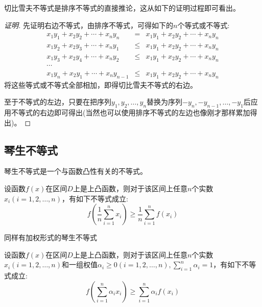 切比雪夫不等式是排序不等式的直接推论，这从如下的证明过程即可看出。

\begin{proof}[证明]
  先证明右边不等式，由排序不等式，可得如下的$n$个等式或不等式:
  \begin{eqnarray*}
    x_1y_1+x_2y_2+\cdots+x_ny_n &=& x_1y_1+x_2y_2+\cdots+x_ny_n \\
    x_1y_2+x_2y_3+\cdots+x_ny_1 & \leqslant & x_1y_1+x_2y_2+\cdots+x_ny_n \\
    x_1y_3+x_2y_4+\cdots+x_ny_2 & \leqslant & x_1y_1+x_2y_2+\cdots+x_ny_n \\
    \cdots & & \\
    x_1y_n+x_2y_1+\cdots+x_ny_{n-1} & \leqslant & x_1y_1+x_2y_2+\cdots+x_ny_n 
  \end{eqnarray*}
  将这些等式或不等式全部相加，即得切比雪夫不等式的右边。

  至于不等式的左边，只要在把序列$y_1,y_2,\ldots,y_n$替换为序列$-y_n,-y_{n-1},\ldots,-y_1$后应用不等式的右边即可得出(当然也可以使用排序不等式的左边也像刚才那样累加得出)。
\end{proof}

\subsection{琴生不等式}
\label{sec:jenson-inequality}

琴生不等式是一个与函数凸性有关的不等式。
\begin{theorem}[琴生不等式]
  设函数$f(x)$在区间$D$上是上凸函数，则对于该区间上任意$n$个实数$x_i(i=1,2,\ldots,n)$，有如下不等式成立:
  \begin{equation}
    \label{eq:jenson-inequality-some-import-inequality}
    f \left( \frac{1}{n} \sum_{i=1}^nx_i \right) \geqslant
    \frac{1}{n} \sum_{i=1}^n f(x_i)
  \end{equation}
\end{theorem}

同样有加权形式的琴生不等式
\begin{theorem}[加权形式的琴生不等式]
  设函数$f(x)$在区间$D$上是上凸函数，则对于该区间上任意$n$个实数$x_i(i=1,2,\ldots,n)$和一组权值$\alpha_i\geqslant 0(i=1,2,\ldots,n), \sum_{i=1}^n\alpha_i=1$，有如下不等式成立:
  \begin{equation}
    \label{eq:jenson-inequality-with-weight}
    f \left( \sum_{i=1}^n\alpha_ix_i \right) \geqslant
    \sum_{i=1}^n \alpha_if(x_i)
  \end{equation}
\end{theorem}

